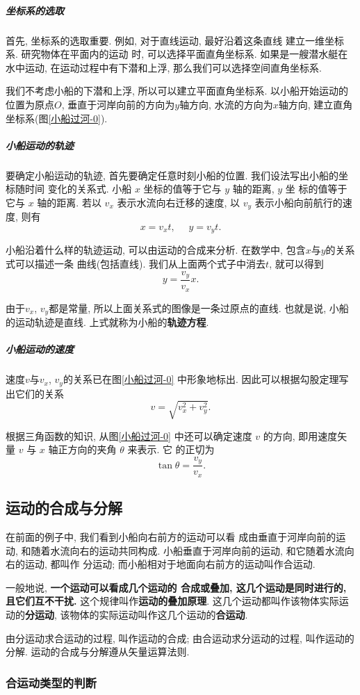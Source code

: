 \documentclass[11pt,a4paper]{ctexbook}
\newcommand{\bre}{\ \ \ }
\begin{document}
\subparagraph{坐标系的选取} 首先, 坐标系的选取重要. 例如, 对于直线运动, 最好沿着这条直线
建立一维坐标系. 研究物体在平面内的运动
时, 可以选择平面直角坐标系. 如果是一艘潜水艇在水中运动, 在运动过程中有下潜和上浮,
那么我们可以选择空间直角坐标系.

我们不考虑小船的下潜和上浮, 所以可以建立平面直角坐标系. 以小船开始运动的位置为原点$O$,
垂直于河岸向前的方向为$y$轴方向, 水流的方向为$x$轴方向, 建立直角坐标系(图\ref{小船过河-0}).

\subparagraph{小船运动的轨迹} 要确定小船运动的轨迹, 首先要确定任意时刻小船的位置. 我们设法写出小船的坐标随时间
变化的关系式. 小船 $x$ 坐标的值等于它与 $y$ 轴的距离, $y$ 坐
标的值等于它与 $x$ 轴的距离. 若以 $v_x$ 表示水流向右迁移的速度,
以 $v_y$ 表示小船向前航行的速度, 则有
$$x = v_xt, \bre\bre y = v_yt.$$

小船沿着什么样的轨迹运动, 可以由运动的合成来分析. 在数学中, 包含$x$与$y$的关系式可以描述一条
曲线(包括直线). 我们从上面两个式子中消去$t$, 就可以得到
$$y = \frac{v_y}{v_x}x.$$

由于$v_x$, $v_y$都是常量, 所以上面关系式的图像是一条过原点的直线.
也就是说, 小船的运动轨迹是直线. 上式就称为小船的\textbf{轨迹方程}.

\subparagraph{小船运动的速度} 速度$v$与$v_x$, $v_y$的关系已在图\ref{小船过河-0} 中形象地标出.
因此可以根据勾股定理写出它们的关系$$v = \sqrt{v_x^2 + v_y^2}.$$

根据三角函数的知识, 从图\ref{小船过河-0} 中还可以确定速度 $v$
的方向, 即用速度矢量 $v$ 与 $x$ 轴正方向的夹角 $\theta$ 来表示. 它
的正切为$$\tan\theta = \frac{v_y}{v_x}.$$

\subsection*{运动的合成与分解}

在前面的例子中, 我们看到小船向右前方的运动可以看
成由垂直于河岸向前的运动, 和随着水流向右的运动共同构成.
小船垂直于河岸向前的运动, 和它随着水流向右的运动, 都叫作
分运动; 而小船相对于地面向右前方的运动叫作合运动.

一般地说, \textbf{一个运动可以看成几个运动的
合成或叠加, 这几个运动是同时进行的, 且它们互不干扰.}
这个规律叫作\textbf{运动的叠加原理}.
这几个运动都叫作该物体实际运动的\textbf{分运动},
该物体的实际运动叫作这几个运动的\textbf{合运动}.

由分运动求合运动的过程, 叫作运动的合成;
由合运动求分运动的过程, 叫作运动的分解.
运动的合成与分解遵从矢量运算法则.

\subsubsection{合运动类型的判断}
\end{document}
